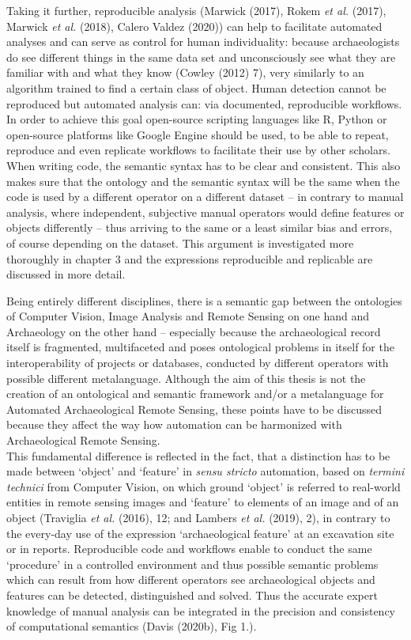 \documentclass[
  12pt,
]{article}
\begin{document}
Taking it further, reproducible analysis (Marwick (2017), Rokem \emph{et al.} (2017), Marwick \emph{et al.} (2018), Calero Valdez (2020)) can help to facilitate automated analyses and can serve as control for human individuality: because archaeologists do see different things in the same data set and unconsciously see what they are familiar with and what they know (Cowley (2012) 7), very similarly to an algorithm trained to find a certain class of object. Human detection cannot be reproduced but automated analysis can: via documented, reproducible workflows. In order to achieve this goal open-source scripting languages like R, Python or open-source platforms like Google Engine should be used, to be able to repeat, reproduce and even replicate workflows to facilitate their use by other scholars. When writing code, the semantic syntax has to be clear and consistent. This also makes sure that the ontology and the semantic syntax will be the same when the code is used by a different operator on a different dataset -- in contrary to manual analysis, where independent, subjective manual operators would define features or objects differently -- thus arriving to the same or a least similar bias and errors, of course depending on the dataset. This argument is investigated more thoroughly in chapter 3 and the expressions reproducible and replicable are discussed in more detail.

Being entirely different disciplines, there is a semantic gap between the ontologies of Computer Vision, Image Analysis and Remote Sensing on one hand and Archaeology on the other hand -- especially because the archaeological record itself is fragmented, multifaceted and poses ontological problems in itself for the interoperability of projects or databases, conducted by different operators with possible different metalanguage. Although the aim of this thesis is not the creation of an ontological and semantic framework and/or a metalanguage for Automated Archaeological Remote Sensing, these points have to be discussed because they affect the way how automation can be harmonized with Archaeological Remote Sensing.\\
This fundamental difference is reflected in the fact, that a distinction has to be made between `object' and `feature' in \emph{sensu stricto} automation, based on \emph{termini technici} from Computer Vision, on which ground `object' is referred to real-world entities in remote sensing images and `feature' to elements of an image and of an object (Traviglia \emph{et al.} (2016), 12; and Lambers \emph{et al.} (2019), 2), in contrary to the every-day use of the expression `archaeological feature' at an excavation site or in reports. Reproducible code and workflows enable to conduct the same `procedure' in a controlled environment and thus possible semantic problems which can result from how different operators see archaeological objects and features can be detected, distinguished and solved. Thus the accurate expert knowledge of manual analysis can be integrated in the precision and consistency of computational semantics (Davis (2020b), Fig 1.).
\end{document}
